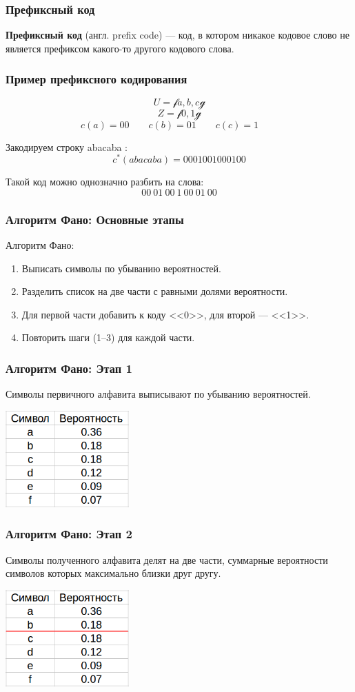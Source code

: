 \documentclass[10pt,pdf,hyperref={unicode}]{beamer}
\begin{document}
\begin{frame}
	\frametitle{Префиксный код}
	\textbf{Префиксный код} (англ. prefix code) --- код, в котором никакое кодовое слово не является префиксом какого-то другого кодового слова.
\end{frame}

\begin{frame}
	\frametitle{Пример префиксного кодирования}
	$$
		U = \mathcal {f} a, b, c \mathcal {g}
	$$$$
		Z = \mathcal {f} 0, 1 \mathcal {g}
	$$$$
		c(a) = 00 \qquad
		c(b) = 01 \qquad
		c(c) = 1 \qquad
	$$

	\vspace{1em}
	Закодируем строку abacaba :
	$$
		c^*(abacaba) = 0001001000100
	$$

	\vspace{1em}
	Такой код можно однозначно разбить на слова:
	$$
		00\ 01\ 00\ 1\ 00\ 01\ 00
	$$
\end{frame}

\begin{frame}
	\frametitle{Алгоритм Фано: Основные этапы}
	Алгоритм Фано:
	\begin{enumerate}
		\item Выписать символы по убыванию вероятностей.
		\item Разделить список на две части с равными долями вероятности.
		\item Для первой части добавить к коду <<0>>, для второй --- <<1>>.
		\item Повторить шаги (1--3) для каждой части.
	\end{enumerate}
\end{frame}


\begin{frame}
	\frametitle{Алгоритм Фано: Этап 1}
	Символы первичного алфавита выписывают по убыванию вероятностей.
	
	\vspace{1em}
	\includegraphics[height=10em]{alg0.png}
\end{frame}

\begin{frame}
	\frametitle{Алгоритм Фано: Этап 2}
	Символы полученного алфавита делят на две части, суммарные вероятности символов которых максимально близки друг другу.
	
	\vspace{1em}
	\includegraphics[height=10em]{alg1.png}
\end{frame}
\end{document}
